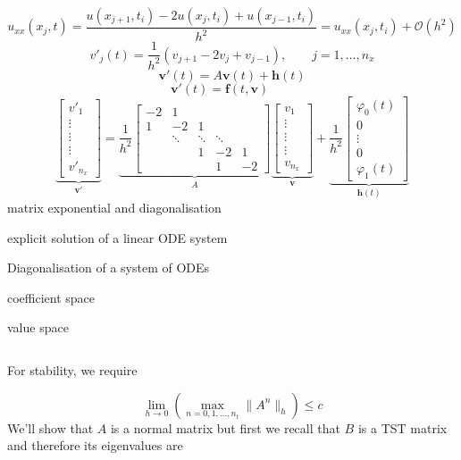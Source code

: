 \documentclass[12pt,a4paper]{article}
\begin{document}
\[
u_{xx}(x_j,t) = \frac{u(x_{j+1},t_{i}) - 2u(x_j,t_{i}) + u(x_{j-1},t_{i})}{h^2} = u_{xx}(x_j,t_i) + \mathcal{O}(h^2)
\]
\[
v'_j(t) = \frac{1}{h^2}\left(v_{j+1} - 2v_j + v_{j-1}   \right), \qquad j  = 1, \ldots, n_x 
\]
\[
\mathbf{v}'(t) = A \mathbf{v}(t) + \mathbf{h}(t)
\]
\[
\mathbf{v}'(t) = \mathbf{f}(t,\mathbf{v}) \qquad 
\]
\[
\underbrace{\begin{bmatrix}
v'_{1} \\
\vdots \\
\vdots \\
\vdots \\
v'_{n_x}
\end{bmatrix}}_{\mathbf{v}'} = 
\underbrace{\frac{1}{h^2}\begin{bmatrix}
- 2 & 1 & & & \\
1  & -2 & 1  & & \\
      & \ddots & \ddots & \ddots & \\
      &        & 1    & -2 & 1 \\
      &        &        & 1 & -2
\end{bmatrix}}_{A}
\underbrace{\begin{bmatrix}
v_{1} \\
\vdots \\
\vdots \\
\vdots \\
v_{n_x}
\end{bmatrix}}_{\mathbf{v}}
+ 
\underbrace{\frac{1}{h^2}\begin{bmatrix}
\varphi_0(t) \\
0 \\
\vdots \\
0 \\
 \varphi_1(t)
\end{bmatrix}}_{\mathbf{h}(t)}
\]
matrix exponential and diagonalisation

explicit solution of a linear ODE system

Diagonalisation of a system of ODEs

coefficient space

value space


\begin{lstlisting}

\end{lstlisting}


For stability, we require 

\[
\lim_{h \to 0}\left( \max_{n = 0, 1, \ldots, n_t} \| A^n \|_h  \right) \leq c
\]
We'll show that $A$ is a normal matrix but first we recall that $B$ is a TST matrix and therefore its eigenvalues are
\end{document}
